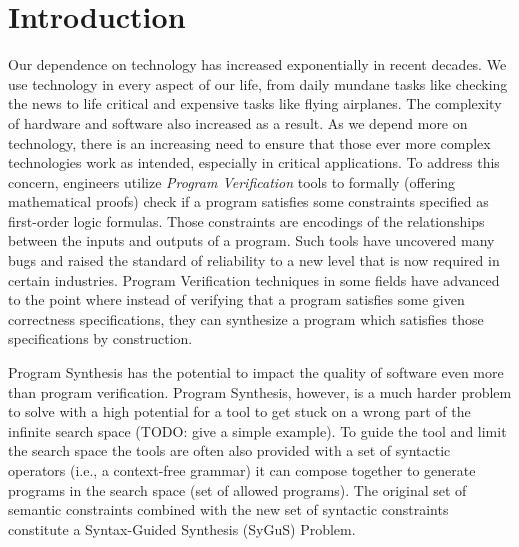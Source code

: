 \section{Introduction}
\label{sec:introduction}
Our dependence on technology has increased exponentially in recent decades.
%
We use technology in every aspect of our life, from daily mundane tasks like checking the news to life critical and expensive tasks like flying airplanes.
%
The complexity of hardware and software also increased as a result.
%
As we depend more on technology, there is an increasing need to ensure that those ever more complex technologies work as intended, especially in critical applications.
%
To address this concern, engineers utilize \emph{Program Verification} tools
%
to formally (offering mathematical proofs) check if a program satisfies some constraints specified as first-order logic formulas.
%
Those constraints are encodings of the relationships between the inputs and outputs of a program.
%
Such tools have uncovered many bugs and raised the standard of reliability to a new level that is now required in certain industries.
%
Program Verification techniques in some fields have advanced to the point where instead of verifying that a program satisfies some given correctness specifications, 
%
they can synthesize a program which satisfies those specifications by construction.

Program Synthesis has the potential to impact the quality of software even more than program verification.
%
Program Synthesis, however, is a much harder problem to solve with a high potential for a tool to get stuck on a wrong part of the infinite search space (TODO: give a simple example).
%
To guide the tool and limit the search space the tools are often also provided with a set of syntactic operators (i.e., a context-free grammar) it can compose together to generate programs in the search space (set of allowed programs).
%
The original set of semantic constraints combined with the new set of syntactic constraints constitute a Syntax-Guided Synthesis (SyGuS) Problem.
